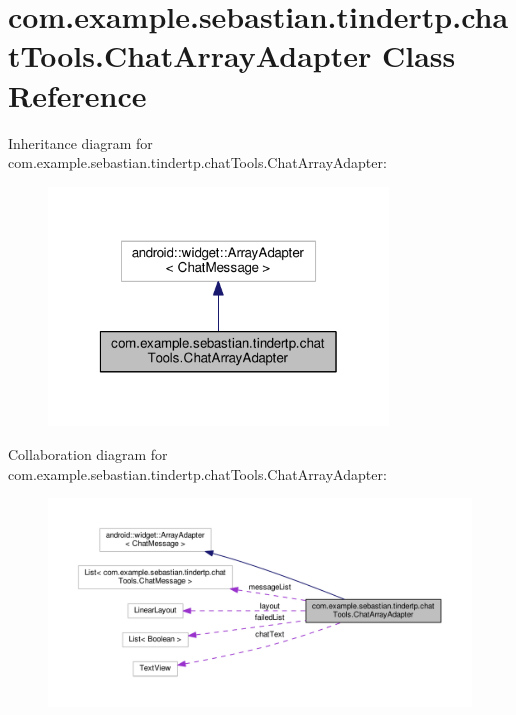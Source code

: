 \hypertarget{classcom_1_1example_1_1sebastian_1_1tindertp_1_1chatTools_1_1ChatArrayAdapter}{}\section{com.\+example.\+sebastian.\+tindertp.\+chat\+Tools.\+Chat\+Array\+Adapter Class Reference}
\label{classcom_1_1example_1_1sebastian_1_1tindertp_1_1chatTools_1_1ChatArrayAdapter}


Inheritance diagram for com.\+example.\+sebastian.\+tindertp.\+chat\+Tools.\+Chat\+Array\+Adapter\+:\nopagebreak
\begin{figure}[H]
\begin{center}
\leavevmode
\includegraphics[width=256pt]{classcom_1_1example_1_1sebastian_1_1tindertp_1_1chatTools_1_1ChatArrayAdapter__inherit__graph}
\end{center}
\end{figure}


Collaboration diagram for com.\+example.\+sebastian.\+tindertp.\+chat\+Tools.\+Chat\+Array\+Adapter\+:\nopagebreak
\begin{figure}[H]
\begin{center}
\leavevmode
\includegraphics[width=350pt]{classcom_1_1example_1_1sebastian_1_1tindertp_1_1chatTools_1_1ChatArrayAdapter__coll__graph}
\end{center}
\end{figure}
